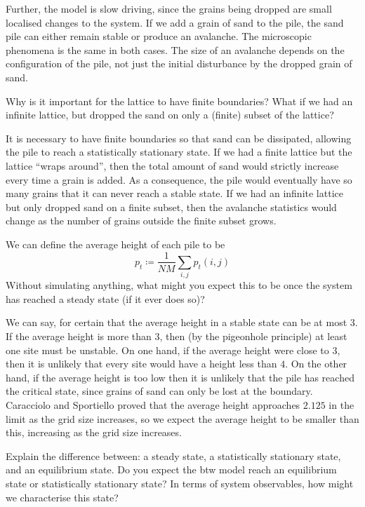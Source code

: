 Further, the model is slow driving, since the grains being dropped are small localised changes to the system. If we add a grain of sand to the pile, the sand pile can either remain stable or produce an avalanche. The microscopic phenomena is the same in both cases. The size of an avalanche depends on the configuration of the pile, not just the initial disturbance by the dropped grain of sand.


\begin{question}
    Why is it important for the lattice to have finite boundaries? What if we had an infinite lattice, but dropped the sand on only a (finite) subset of the lattice?
\end{question}

It is necessary to have finite boundaries so that sand can be dissipated, allowing the pile to reach a statistically stationary state. If we had a finite lattice but the lattice ``wraps around'', then the total amount of sand would strictly increase every time a grain is added. As a consequence, the pile would eventually have so many grains that it can never reach a stable state. If we had an infinite lattice but only dropped sand on a finite subset, then the avalanche statistics would change as the number of grains outside the finite subset grows.


\begin{question}
    We can define the average height of each pile to be
    \[ p_t\coloneq \frac{1}{NM}\sum_{i,j}p_t(i,j)\]
    Without simulating anything, what might you expect this to be once the system has reached a steady state (if it ever does so)?
\end{question}

We can say, for certain that the average height in a stable state can be at most $3$. If the average height is more than $3$, then (by the pigeonhole principle) at least one site must be unstable. On one hand, if the average height were close to $3$, then it is unlikely that every site would have a height less than $4$. On the other hand, if the average height is too low then it is unlikely that the pile has reached the critical state, since grains of sand can only be lost at the boundary. Caracciolo and Sportiello \cite{Car12} proved that the average height approaches $2.125$ in the limit as the grid size increases, so we expect the average height to be smaller than this, increasing as the grid size increases.




\begin{question}
    Explain the difference between: a steady state, a statistically stationary state, and an equilibrium state. Do you expect the btw model reach an equilibrium state or statistically stationary state? In terms of system observables, how might we characterise this state?
\end{question}

